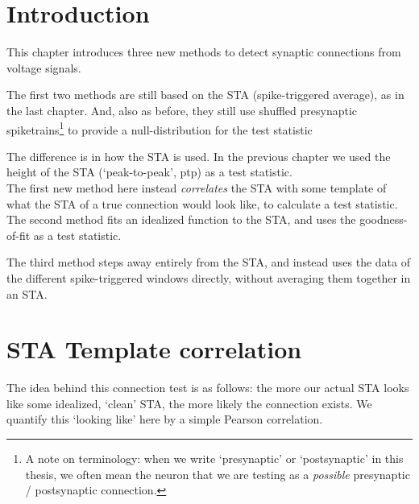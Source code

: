 
\section{Introduction}

This chapter introduces three new methods to detect synaptic connections from voltage signals.

The first two methods are still based on the STA (spike-triggered average), as in the last chapter. And, also as before, they still use shuffled presynaptic spiketrains\footnote{
    A note on terminology: when we write `presynaptic' or `postsynaptic' in this thesis, we often mean the neuron that we are testing as a \emph{possible} presynaptic / postsynaptic connection.
}
to provide a null-distribution for the test statistic

The difference is in how the STA is used. In the previous chapter we used the height of the STA (`peak-to-peak', ptp) as a test statistic.\\
The first new method here instead \emph{correlates} the STA with some template of what the STA of a true connection would look like, to calculate a test statistic.\\
The second method fits an idealized function to the STA, and uses the goodness-of-fit as a test statistic.

The third method steps away entirely from the STA, and instead uses the data of the different spike-triggered windows directly, without averaging them together in an STA.






\section{STA Template correlation}


The idea behind this connection test is as follows: the more our actual STA looks like some idealized, `clean' STA, the more likely the connection exists. We quantify this `looking like' here by a simple Pearson correlation.

